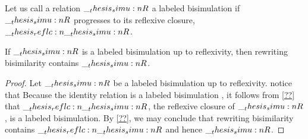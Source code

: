 Let us call a relation $\__thesis_simu:n {R}$ a labeled bisimulation  if $\__thesis_simu:n {R}$ progresses to its reflexive closure, $\reflc{\simu{R}}$.
\begin{theorem}\label{thm:bisim-technique-up-to-refl}
  If $\__thesis_simu:n {R}$ is a labeled bisimulation up to reflexivity, then rewriting bisimilarity contains $\__thesis_simu:n {R}$.
\end{theorem}
\begin{proof}
  Let $\__thesis_simu:n {R}$ be a labeled bisimulation up to reflexivity.
  notice that 
  Because the identity relation is a labeled bisimulation , it follows from \cref{??} that $\reflc{\simu{R}}$, the reflexive closure of $\__thesis_simu:n {R}$, is a labeled bisimulation.
  By \cref{??}, we may conclude that rewriting bisimilarity contains $\reflc{\simu{R}}$ and hence $\__thesis_simu:n {R}$.
\end{proof}


